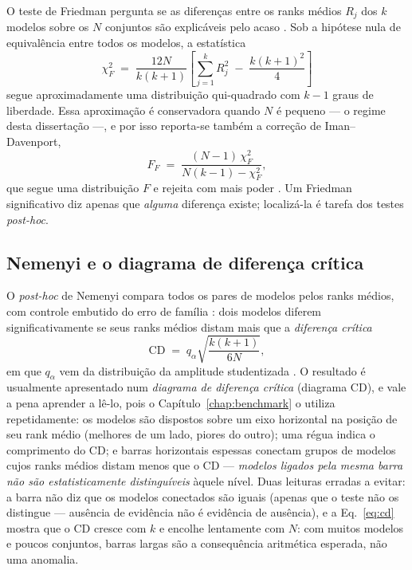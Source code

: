 O teste de Friedman pergunta
se as diferenças entre os ranks médios $R_j$ dos $k$ modelos sobre os $N$
conjuntos são explicáveis pelo acaso \citep{friedman1937}. Sob a hipótese nula de equivalência
entre todos os modelos, a estatística
\begin{equation}
  \chi^2_F \;=\; \frac{12N}{k(k+1)}
  \left[ \sum_{j=1}^{k} R_j^2 \;-\; \frac{k(k+1)^2}{4} \right]
  \label{eq:friedman}
\end{equation}
segue aproximadamente uma distribuição qui-quadrado com $k-1$ graus de
liberdade. Essa aproximação é conservadora quando $N$ é pequeno --- o
regime desta dissertação ---, e por isso reporta-se também a correção de
Iman--Davenport,
\begin{equation}
  F_F \;=\; \frac{(N-1)\,\chi^2_F}{N(k-1) - \chi^2_F},
  \label{eq:iman-davenport}
\end{equation}
que segue uma distribuição $F$ e rejeita com mais poder \citep{imandavenport1980}. Um Friedman
significativo diz apenas que \emph{alguma} diferença existe; localizá-la é
tarefa dos testes \emph{post-hoc}.

\subsection{Nemenyi e o diagrama de diferença crítica}

O \emph{post-hoc} de
Nemenyi compara todos os pares de modelos pelos ranks médios, com controle
embutido do erro de família \citep{nemenyi1963}: dois modelos diferem significativamente se seus
ranks médios distam mais que a \emph{diferença crítica}
\begin{equation}
  \mathrm{CD} \;=\; q_\alpha \sqrt{\frac{k(k+1)}{6N}},
  \label{eq:cd}
\end{equation}
em que $q_\alpha$ vem da distribuição da amplitude studentizada
\citep{demsar2006}. O resultado é usualmente apresentado num \emph{diagrama
de diferença crítica} (diagrama CD), e vale a pena aprender a lê-lo, pois o
Capítulo~\ref{chap:benchmark} o utiliza repetidamente: os modelos são dispostos sobre um eixo
horizontal na posição de seu rank médio (melhores de um lado, piores do
outro); uma régua indica o comprimento do CD; e barras horizontais espessas
conectam grupos de modelos cujos ranks médios distam menos que o CD ---
\emph{modelos ligados pela mesma barra não são estatisticamente
distinguíveis} àquele nível. Duas leituras erradas a evitar: a barra não
diz que os modelos conectados são iguais (apenas que o teste não os
distingue --- ausência de evidência não é evidência de ausência), e a
Eq.~\ref{eq:cd} mostra que o CD cresce com $k$ e encolhe lentamente com
$N$: com muitos modelos e poucos conjuntos, barras largas são a
consequência aritmética esperada, não uma anomalia.

